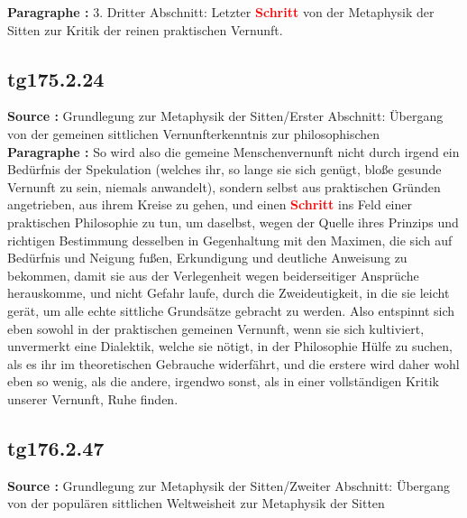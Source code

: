 \documentclass[a4paper,12pt,twoside]{book}
\newcommand{\match}[1]{\textcolor{red}{\textbf{#1}}}
\begin{document}
	\noindent\textbf{Paragraphe : }3. Dritter Abschnitt: Letzter \match{Schritt} von der Metaphysik der Sitten zur Kritik der reinen praktischen Vernunft. 
	
	\subsection*{tg175.2.24} 
	\textbf{Source : }Grundlegung zur Metaphysik der Sitten/Erster Abschnitt: Übergang von der gemeinen sittlichen Vernunfterkenntnis zur philosophischen\\  
	
	\noindent\textbf{Paragraphe : }So wird also die gemeine Menschenvernunft nicht durch irgend ein Bedürfnis der Spekulation (welches ihr, so lange sie sich genügt, bloße gesunde Vernunft zu sein, niemals anwandelt), sondern selbst aus praktischen Gründen  angetrieben, aus ihrem Kreise zu gehen, und einen \match{Schritt} ins Feld einer praktischen Philosophie zu tun, um daselbst, wegen der Quelle ihres Prinzips und richtigen Bestimmung desselben in Gegenhaltung mit den Maximen, die sich auf Bedürfnis und Neigung fußen, Erkundigung und deutliche Anweisung zu bekommen, damit sie aus der Verlegenheit wegen beiderseitiger Ansprüche herauskomme, und nicht Gefahr laufe, durch die Zweideutigkeit, in die sie leicht gerät, um alle echte sittliche Grundsätze gebracht zu werden. Also entspinnt sich eben sowohl in der praktischen gemeinen Vernunft, wenn sie sich kultiviert, unvermerkt eine Dialektik, welche sie nötigt, in der Philosophie Hülfe zu suchen, als es ihr im theoretischen Gebrauche widerfährt, und die erstere wird daher wohl eben so wenig, als die andere, irgendwo sonst, als in einer vollständigen Kritik unserer Vernunft, Ruhe finden. 
	
	\subsection*{tg176.2.47} 
	\textbf{Source : }Grundlegung zur Metaphysik der Sitten/Zweiter Abschnitt: Übergang von der populären sittlichen Weltweisheit zur Metaphysik der Sitten\\  
	
\end{document}
